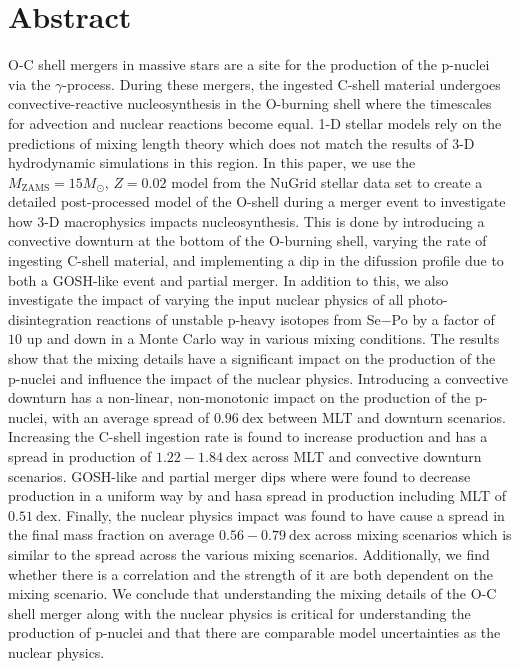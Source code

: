 \section{Abstract}

O-C shell mergers in massive stars are a site for the production of the p-nuclei via the $\gamma$-process. 
During these mergers, the ingested C-shell material undergoes convective-reactive nucleosynthesis in the O-burning shell where the timescales for advection and nuclear reactions become equal.
1-D stellar models rely on the predictions of mixing length theory which does not match the results of 3-D hydrodynamic simulations in this region.
In this paper, we use the $M_{\mathrm{ZAMS}}=15 M_\odot$, $Z=0.02$ model from the NuGrid stellar data set \cite{ritterNuGridStellarData2018} to create a detailed post-processed model of the O-shell during a merger event to investigate how 3-D macrophysics impacts nucleosynthesis.
This is done by introducing a convective downturn at the bottom of the O-burning shell, varying the rate of ingesting C-shell material, and implementing a dip in the difussion profile due to both a GOSH-like event and partial merger.
In addition to this, we also investigate the impact of varying the input nuclear physics of all photo-disintegration reactions of unstable p-heavy isotopes from Se$-$Po by a factor of $10$ up and down in a Monte Carlo way in various mixing conditions.
The results show that the mixing details have a significant impact on the production of the p-nuclei and influence the impact of the nuclear physics.
Introducing a convective downturn has a non-linear, non-monotonic impact on the production of the p-nuclei, with an average spread of $0.96~\mathrm{dex}$ between MLT and downturn scenarios.
Increasing the C-shell ingestion rate is found to increase production and has a spread in production of $1.22-1.84~\mathrm{dex}$ across MLT and convective downturn scenarios.
GOSH-like and partial merger dips where were found to decrease production in a uniform way by and hasa  spread in production including MLT of $0.51~\mathrm{dex}$.
Finally, the nuclear physics impact was found to have cause a spread in the final mass fraction on average $0.56-0.79~\mathrm{dex}$ across mixing scenarios which is similar to the spread across the various mixing scenarios.
Additionally, we find whether there is a correlation and the strength of it are both dependent on the mixing scenario.
We conclude that understanding the mixing details of the O-C shell merger along with the nuclear physics is critical for understanding the production of p-nuclei and that there are comparable model uncertainties as the nuclear physics.

